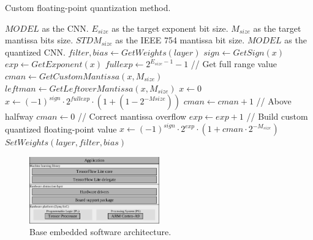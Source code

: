 \begin{algorithm}[h!]
	\label{alg:quantize_training}
	\caption{Custom floating-point quantization method.}
	\begin{algorithmic}
		\SetAlgoLined
		\renewcommand{\algorithmicrequire}{\textbf{input:}}
		\renewcommand{\algorithmicensure}{\textbf{output:}}
		\REQUIRE $MODEL$ as the CNN.
		\REQUIRE $E_{size}$ as the target exponent bit size.
		\REQUIRE $M_{size}$ as the target mantissa bits size.
		\REQUIRE $STDM_{size}$ as the IEEE 754 mantissa bit size.
		\ENSURE $MODEL$ as the quantized CNN.
		\STATE $filter, bias \gets GetWeights(layer)$
			\STATE $sign \gets GetSign(x)$
			\STATE $exp \gets GetExponent(x)$
			\STATE $fullexp \gets 2^{E_{size}-1}-1$ // Get full range value
			\STATE $cman \gets GetCustomMantissa(x, M_{size})$
			\STATE $leftman \gets GetLeftoverMantissa(x, M_{size})$
				\STATE$x\gets0$
				\STATE$x\gets (-1)^{sign}\cdot2^{fullexp}\cdot(1+(1-2^{-M{size}}))$
			\ELSE
					\STATE $cman \gets cman+1$ // Above halfway
					\STATE $cman \gets 0$ // Correct mantissa overflow
					\STATE $exp \gets exp + 1$
					\ENDIF
				\ENDIF
				\STATE // Build custom quantized floating-point value
				\STATE$x\gets (-1)^{sign}\cdot2^{exp}\cdot(1+cman\cdot2^{-M_{size}})$
			\ENDIF
		\ENDFOR
		\STATE $SetWeights(layer, filter, bias)$
		\ENDIF
		\ENDFOR
	\end{algorithmic}
\end{algorithm}
\begin{figure}[t!]
	\centering
	\includegraphics[width=0.5\textwidth]{../figures/sw_stack.pdf}
	\caption{Base embedded software architecture.}
	\label{fig:sw_stack}
\end{figure}
